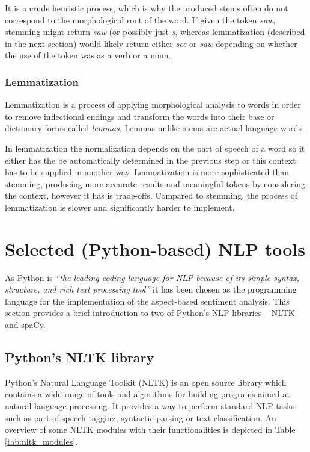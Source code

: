 It is a crude heuristic process, which is why the produced stems often do not correspond to the morphological root of the word.  If given the token \textit{saw}, stemming might return \textit{saw} (or possibly just \textit{s}, whereas lemmatization (described in the next section) would likely return either \textit{see} or \textit{saw} depending on whether the use of the token was as a verb or a noun. \cite{stemming_vs_lemmatization_twd}

\subsubsection{Lemmatization}
Lemmatization is a process of applying morphological analysis to words in order to remove inflectional endings and transform the words into their base or dictionary forms called \textit{lemmas}. Lemmas unlike stems are actual language words. \cite{stopwords} 

In lemmatization the normalization depends on the part of speech of a word so it either has the be automatically determined in the previous step or this context has to be supplied in another way. 
Lemmatization is more sophisticated than stemming, producing more accurate results and meaningful tokens by considering the context, however it has is trade-offs. Compared to stemming, the process of lemmatization is slower and significantly harder to implement.

\section{Selected (Python-based) NLP tools}
As Python is \textit{``the leading coding language for NLP because of its simple syntax, structure, and rich text processing tool''} \cite{python_best} it has been chosen as the programming language for the implementation of the aspect-based sentiment analysis. This section provides a brief introduction to two of Python's NLP libraries -- NLTK and spaCy.
\subsection{Python's NLTK library}
Python's Natural Language Toolkit (NLTK) is an open source library which contains a wide range of tools and algorithms for building programs aimed at natural language processing. It provides a way to perform standard NLP tasks such as part-of-speech tagging, syntactic parsing or text classification. An overview of some NLTK modules with their functionalities is depicted in Table \ref{tab:nltk_modules}.

